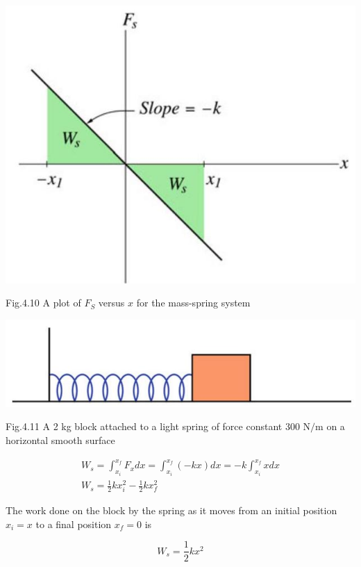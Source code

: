 \documentclass[10pt]{article}
\begin{document}
\begin{center}
\includegraphics[max width=\textwidth]{2024_09_13_db1f357d2aad0a03eb2eg-067(3)}
\end{center}

Fig.4.10 A plot of $F_{S}$ versus $x$ for the mass-spring system

\begin{center}
\includegraphics[max width=\textwidth]{2024_09_13_db1f357d2aad0a03eb2eg-067(2)}
\end{center}

Fig.4.11 A 2 kg block attached to a light spring of force constant 300 $\mathrm{N} / \mathrm{m}$ on a horizontal smooth surface

$$
\begin{gathered}
W_{s}=\int_{x_{i}}^{x_{f}} F_{x} d x=\int_{x_{i}}^{x_{f}}(-k x) d x=-k \int_{x_{i}}^{x_{f}} x d x \\
W_{s}=\frac{1}{2} k x_{i}^{2}-\frac{1}{2} k x_{f}^{2}
\end{gathered}
$$

The work done on the block by the spring as it moves from an initial position $x_{i}=x$ to a final position $x_{f}=0$ is

$$
W_{s}=\frac{1}{2} k x^{2}
$$
\end{document}
